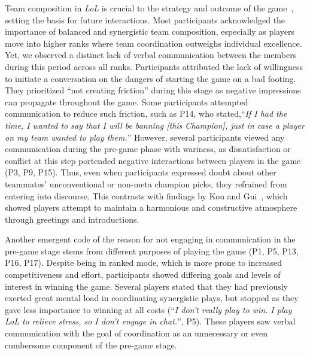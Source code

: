 Team composition in \textit{LoL} is crucial to the strategy and outcome of the game~\cite{ong2015player}, setting the basis for future interactions. Most participants acknowledged the importance of balanced and synergistic team composition, especially as players move into higher ranks where team coordination outweighs individual excellence. Yet, we observed a distinct lack of verbal communication between the members during this period across all ranks. Participants attributed the lack of willingness to initiate a conversation on the dangers of starting the game on a bad footing. They prioritized ``not creating friction'' during this stage as negative impressions can propagate throughout the game. Some participants attempted communication to reduce such friction, such as P14, who stated,``\textit{If I had the time, I wanted to say that I will be banning [this Champion], just in case a player on my team wanted to play them.}'' However, several participants viewed any communication during the pre-game phase with wariness, as dissatisfaction or conflict at this step portended negative interactions between players in the game (P3, P9, P15). Thus, even when participants expressed doubt about other teammates' unconventional or non-meta champion picks, they refrained from entering into discourse. This contrasts with findings by Kou and Gui~\cite{kou2014}, which showed players attempt to maintain a harmonious and constructive atmosphere through greetings and introductions.

Another emergent code of the reason for not engaging in communication in the pre-game stage stems from different purposes of playing the game (P1, P5, P13, P16, P17). Despite being in ranked mode, which is more prone to increased competitiveness and effort, participants showed differing goals and levels of interest in winning the game. Several players stated that they had previously exerted great mental load in coordinating synergistic plays, but stopped as they gave less importance to winning at all costs (``\textit{I don't really play to win. I play \textit{LoL} to relieve stress, so I don't engage in chat.}'', P5). These players saw verbal communication with the goal of coordination as an unnecessary or even cumbersome component of the pre-game stage.


